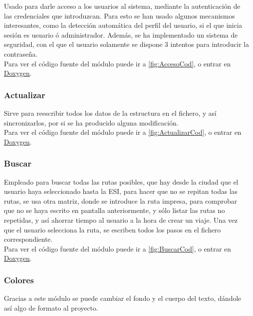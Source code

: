 Usado para darle acceso a los usuarios al sistema, mediante la autenticación de las credenciales que introduzcan.
Para esto se han usado algunos mecanismos interesantes, como la detección automática del perfil del usuario, si el que inicia sesión es usuario ó administrador.
Además, se ha implementado un sistema de seguridad, con el que el usuario solamente se dispone 3 intentos para introducir la contraseña.\\

Para ver el código fuente del módulo puede ir a \ref{fig:AccesoCod}, o entrar en \href{DOC_DOXYGEN/acceso_8h_source.html}{Doxygen}.
\label{fig:Acceso}

\subsubsection{Actualizar}

Sirve para reescribir todos los datos de la estructura en el fichero, y así sincronizarlos, por si se ha producido alguna modificación.\\

Para ver el código fuente del módulo puede ir a \ref{fig:ActualizarCod}, o entrar en \href{DOC_DOXYGEN/actualizar_8h_source.html}{Doxygen}.
\label{fig:Actualizar}

\subsubsection{Buscar}

Empleado para buscar todas las rutas posibles, que hay desde la ciudad que el usuario haya seleccionado
hasta la ESI, para hacer que no se repitan todas las rutas, se usa otra matriz, donde se introduce la ruta impresa, para comprobar que no se haya escrito en pantalla anteriormente,
y sólo listar las rutas no repetidas, y así ahorrar tiempo al usuario a la hora de crear un viaje. Una vez que el usuario selecciona la ruta, se escriben
todos los pasos en el fichero correspondiente.\\

Para ver el código fuente del módulo puede ir a \ref{fig:BuscarCod}, o entrar en \href{DOC_DOXYGEN/buscar_8h_source.html}{Doxygen}.
\label{fig:Buscar}

\subsubsection{Colores}

Gracias a este módulo se puede cambiar el fondo y el cuerpo del texto, dándole así algo de formato al proyecto.\\


